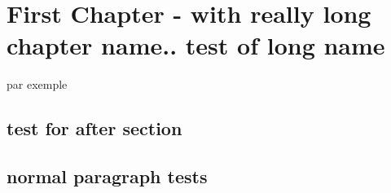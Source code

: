 \chapter{First Chapter - with really long chapter name.. test of long name}
\pagebreak
\begin{paragraph}[color=red,size=\tiny][V][oico]
par exemple
\blindtext
\bfseries{\blindtext}
\end{paragraph}
\begin{paragraph}[background=orange,headingColor=blue,heading=test]
\blindtext
\end{paragraph}
\begin{paragraph}[background=blue]
\blindtext
\end{paragraph}
\section{test for after section}
\begin{paragraph}
\blindtext
\end{paragraph}
\section{normal paragraph tests}
\blindtext

\blindtext

\blindtext

\blindtext
